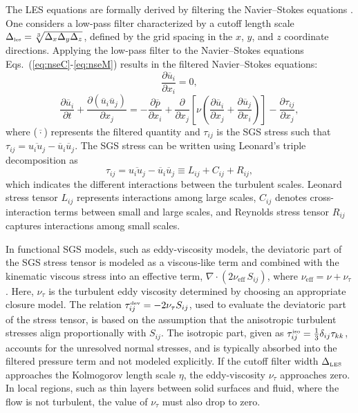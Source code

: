 \documentclass[final,3p]{elsarticle}
\begin{document}
The LES equations are formally derived by filtering the Navier--Stokes equations \citep{ferziger1977,lesieur1996,mason1994,rogallo1984,sagaut2005}. One considers a low-pass filter characterized by a cutoff length scale $\Delta_{\hbox{\tiny les}} = \sqrt[3]{\Delta_x\Delta_y\Delta_z}$, defined by the grid spacing in the $x$, $y$, and $z$ coordinate directions. Applying the low-pass filter to the Navier--Stokes equations Eqs.~(\ref{eq:nseC}-\ref{eq:nseM}) results in the filtered Navier--Stokes equations:
%
\begin{equation}
	\frac{\partial \overline{u}_{i}}{\partial x_i} = 0,
	\label{eq:nseLES1}
\end{equation}
%
\begin{equation}
	\frac{\partial \overline{u}_i}{\partial t} + \frac{\partial \left(\overline{u}_{i}\overline{u}_{j}\right)}{\partial x_j} = -\frac{\partial \overline{p}}{\partial x_i} + \frac{\partial }{\partial x_j}\left[\nu\left(\frac{\partial \overline{u}_i}{\partial x_j} + \frac{\partial \overline{u}_j}{\partial x_i}\right)\right] - \frac{\partial \tau_{ij}}{\partial x_j},
	\label{eq:nseLES2}
\end{equation}
%
where ($\overline{\cdot}$) represents the filtered quantity and  $\tau_{ij}$ is the SGS stress such that  $\tau_{ij} = \overline{u_{i} u_{j}}- \overline{u}_i \overline{u}_j$. The SGS stress can be written using Leonard's triple decomposition \cite{leonard1974} as
\begin{equation}
	\tau_{ij} =  \overline{u_iu_j}-\overline{u}_i\overline{u}_j \equiv L_{ij} + C_{ij} + R_{ij},
	\label{eq:stdLES}
\end{equation}
which indicates the different interactions between the turbulent scales. Leonard stress tensor $L_{ij}$ represents interactions among large scales, $C_{ij}$ denotes cross-interaction terms between small and large scales, and Reynolds stress tensor $R_{ij}$ captures interactions among small scales. 

In functional SGS models, such as eddy-viscosity models, the deviatoric part of the SGS stress tensor is modeled as a viscous-like term and combined with the kinematic viscous stress into an effective term, $\nabla \cdot \left(2 \nu_{\text{eff}} \, S_{ij} \right)$, where $\nu_{\text{eff}} = \nu + \nu_{\tau}$. Here, $\nu_{\tau}$ is the turbulent eddy viscosity determined by choosing an appropriate closure model. The relation $\tau_{ij}^{\hbox{\tiny dev}} = -2 \nu_{\tau} S_{ij}$, used to evaluate the deviatoric part of the stress tensor, is based on the assumption that the anisotropic turbulent stresses align proportionally with ${S}_{ij}$. The isotropic part, given as $\tau_{ij}^{\hbox{\tiny iso}} = \frac{1}{3}\delta_{ij} \tau_{kk}$, accounts for the unresolved normal stresses, and is typically absorbed into the filtered pressure term and not modeled explicitly. If the cutoff filter width $\Delta_{\hbox {\tiny LES}}$ approaches the Kolmogorov length scale $\eta$, the eddy-viscosity $\nu_{\tau}$ approaches zero. In local regions, such as thin layers between solid surfaces and fluid, where the flow is not turbulent, the value of $\nu_{\tau}$ must also drop to zero. 
\end{document}
